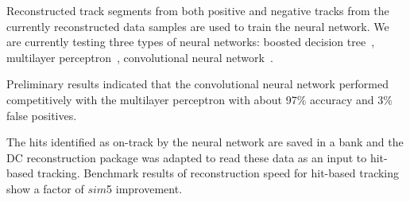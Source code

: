 
Reconstructed track segments from both positive and negative tracks from the currently reconstructed data
samples are used to train the neural network. We are currently testing three types of neural networks: boosted
decision tree~\cite{bdt}, multilayer perceptron~\cite{mp}, convolutional neural network~\cite{cnn}. 


Preliminary results indicated that the convolutional neural network performed competitively with the multilayer
perceptron with about 97\% accuracy and 3\% false positives. 

The hits identified as on-track by the neural network are saved in a bank and the DC reconstruction package was
adapted to read these data as an input to hit-based tracking. Benchmark results of reconstruction speed for
hit-based tracking show a factor of $sim$5  improvement.


